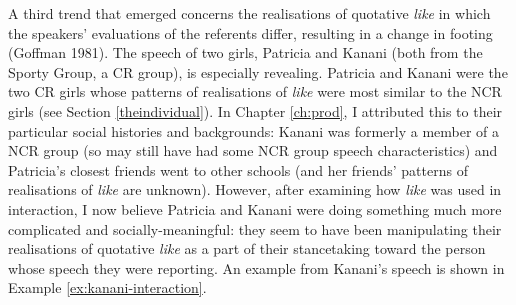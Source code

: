 A third trend that emerged concerns the realisations of quotative \textit{like} in which the speakers' evaluations of the referents differ, resulting in a change in footing (Goffman 1981).  The speech of two girls, Patricia and Kanani (both from the Sporty Group, a CR group), is especially revealing.  Patricia and Kanani were the two CR girls whose patterns of realisations of \textit{like} were most similar to the NCR girls (see Section \ref{theindividual}).  In Chapter \ref{ch:prod}, I attributed this to their particular social histories and backgrounds: Kanani was formerly a member of a NCR group (so may still have had some NCR group speech characteristics) and Patricia's closest friends went to other schools (and her friends' patterns of realisations of \textit{like} are unknown).  However, after examining how \textit{like} was used in interaction, I now believe Patricia and Kanani were doing something much more complicated and socially-meaningful: they seem to have been manipulating their realisations of quotative \textit{like} as a part of their stancetaking toward the person whose speech they were reporting.  An example from Kanani's speech is shown in Example \ref{ex:kanani-interaction}.  
\nocite{goffman1981}


\label{ex:kanani-interaction}

